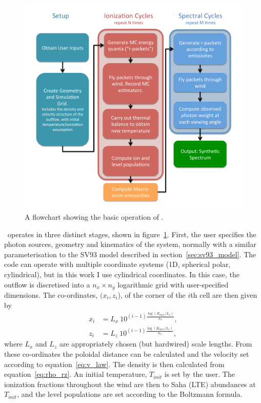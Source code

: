 \begin{figure}
\centering
\includegraphics[width=1.0\textwidth]{figures/03-radtrans/flowchart.pdf}
\caption
{
A flowchart showing the basic operation of \py.
} 
\label{fig:flowchart}
\end{figure}

\py\ operates in three distinct stages, shown in figure~\ref{fig:flowchart}. 
First, the user specifies the photon sources,
geometry and kinematics of the system, normally with a similar parameterisation
to the SV93 model described in section~\ref{sec:sv93_model}. 
The code can operate with multiple coordinate systems 
(1D, spherical polar, cylindrical), but in this work I use cylindrical coordinates.
In this case, the outflow is discretised into a $n_x \times n_y$ logarithmic grid with 
user-specified dimensions. The co-ordinates, $(x_i, z_i$), 
of the corner of the $i$th cell are then given by
\begin{align}
x_i &= L_{x}~10^{(i-1)\frac{\log (R_{max} / L_{x})}{n_x}},\\
z_i &= L_{z}~10^{(i-1)\frac{\log (R_{max} / L_{z})}{n_z}},
\end{align}
where $L_x$ and $L_z$ are appropriately chosen (but hardwired) scale lengths.
From these co-ordinates the poloidal distance can be calculated and
the velocity set according to equation~\ref{eq:v_law}. The density
is then calculated from equation~\ref{eq:rho_rz}. An initial temperature,
$T_{init}$ is set by the user. The ionization fractions throughout
the wind are then to Saha (LTE) abundances at $T_{init}$, and the level 
populations are set according to the Boltzmann formula.

